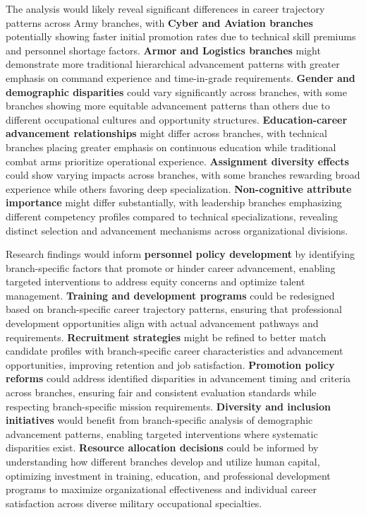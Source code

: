 \documentclass[main.tex]{subfiles}
\begin{document}

The analysis would likely reveal significant differences in career trajectory patterns across Army branches, with \textbf{Cyber and Aviation branches} potentially showing faster initial promotion rates due to technical skill premiums and personnel shortage factors. \textbf{Armor and Logistics branches} might demonstrate more traditional hierarchical advancement patterns with greater emphasis on command experience and time-in-grade requirements. \textbf{Gender and demographic disparities} could vary significantly across branches, with some branches showing more equitable advancement patterns than others due to different occupational cultures and opportunity structures. \textbf{Education-career advancement relationships} might differ across branches, with technical branches placing greater emphasis on continuous education while traditional combat arms prioritize operational experience. \textbf{Assignment diversity effects} could show varying impacts across branches, with some branches rewarding broad experience while others favoring deep specialization. \textbf{Non-cognitive attribute importance} might differ substantially, with leadership branches emphasizing different competency profiles compared to technical specializations, revealing distinct selection and advancement mechanisms across organizational divisions.


Research findings would inform \textbf{personnel policy development} by identifying branch-specific factors that promote or hinder career advancement, enabling targeted interventions to address equity concerns and optimize talent management. \textbf{Training and development programs} could be redesigned based on branch-specific career trajectory patterns, ensuring that professional development opportunities align with actual advancement pathways and requirements. \textbf{Recruitment strategies} might be refined to better match candidate profiles with branch-specific career characteristics and advancement opportunities, improving retention and job satisfaction. \textbf{Promotion policy reforms} could address identified disparities in advancement timing and criteria across branches, ensuring fair and consistent evaluation standards while respecting branch-specific mission requirements. \textbf{Diversity and inclusion initiatives} would benefit from branch-specific analysis of demographic advancement patterns, enabling targeted interventions where systematic disparities exist. \textbf{Resource allocation decisions} could be informed by understanding how different branches develop and utilize human capital, optimizing investment in training, education, and professional development programs to maximize organizational effectiveness and individual career satisfaction across diverse military occupational specialties.

\end{document}

